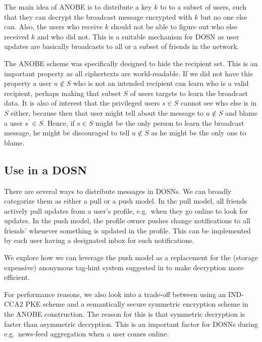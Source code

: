 The main idea of \ac{ANOBE} is to distribute a key \(k\) to to a subset of 
users, such that they can decrypt the broadcast message encrypted with \(k\) 
but no one else can.
Also, the users who receive \(k\) should not be able to figure out who else 
received \(k\) and who did not.
This is a suitable mechanism for \ac{DOSN} as user updates are basically 
broadcasts to all or a subset of friends in the network.

The \ac{ANOBE} scheme was specifically designed to hide the recipient set.
This is an important property as all ciphertexts are world-readable.
If we did not have this property a user \(u\notin S\) who is not an intended 
recipient can learn who is a valid recipient, perhaps making that subset \(S\) 
of users targets to learn the broadcast data.
It is also of interest that the privileged users \(s\in S\) cannot see who else 
is in \(S\) either, because then that user might tell about the message to 
\(u\notin S\) and blame a user \(s^\prime\in S\).
Hence, if \(s\in S\) might be the only person to learn the broadcast message, 
he might be discouraged to tell \(u\notin S\) as he might be the only one to 
blame.

\subsection{Use in a \acs{DOSN}}

There are several ways to distribute messages in \acp{DOSN}.
We can broadly categorize them as either a pull or a push model.
In the pull model, all friends actively pull updates from a user's profile, 
e.g.~when they go online to look for updates.
In the push model, the profile owner pushes change notifications to all 
friends' whenever something is updated in the profile.
This can be implemented by each user having a designated inbox for such 
notifications.

We explore how we can leverage the push model as a replacement for the (storage 
expensive) anonymous tag-hint system suggested in \cite{anobe} to make 
decryption more efficient.

For performance reasons, we also look into a trade-off between using an 
IND-CCA2 \ac{PKE} scheme and a semantically secure symmetric encryption scheme 
in the \ac{ANOBE} construction.
The reason for this is that symmetric decryption is faster than asymmetric 
decryption.
This is an important factor for \acp{DOSN} during e.g.~news-feed aggregation 
when a user comes online.

